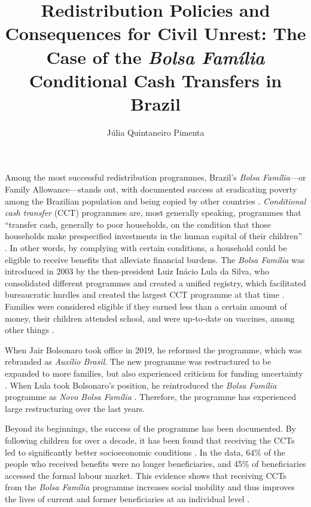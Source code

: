 \documentclass[stu,12pt]{apa7}
\title{Redistribution Policies and Consequences for Civil Unrest: The Case of the \textit{Bolsa Família} Conditional Cash Transfers in Brazil}
\author{Júlia Quintaneiro Pimenta}
\affiliation{\mbox{Master in the Social Sciences, Universidad Carlos III de Madrid}}
\begin{document}
\maketitle

Among the most successful redistribution programmes, Brazil’s \textit{Bolsa Família}—or Family Allowance—stands out, with documented success at eradicating poverty among the Brazilian population and being copied by other countries \parencite{franConditionalCashTransfers}. \textit{Conditional cash transfer} (CCT) programmes are, most generally speaking, programmes that “transfer cash, generally to poor households, on the condition that those households make prespecified investments in the human capital of their children” \parencite[1]{franConditionalCashTransfers}. In other words, by complying with certain conditions, a household could be eligible to receive benefits that alleviate financial burdens. The \textit{Bolsa Família} was introduced in 2003 by the then-president Luiz Inácio Lula da Silva, who consolidated different programmes and created a unified registry, which facilitated bureaucratic hurdles and created the largest CCT programme at that time \parencite{PDFNutsBolts}. Families were considered eligible if they earned less than a certain amount of money, their children attended school, and were up-to-date on vaccines, among other things \parencite{PDFNutsBolts}.

When Jair Bolsonaro took office in 2019, he reformed the programme, which was rebranded as \textit{Auxílio Brasil}. The new programme was restructured to be expanded to more families, but also experienced criticism for funding uncertainty \parencite{figueiredoProgramaAuxilioBrasil2022}. When Lula took Bolsonaro’s position, he reintroduced the \textit{Bolsa Família} programme as \textit{Novo Bolsa Família} \parencite{valeEfeitoAumentoNo2025a}. Therefore, the programme has experienced large restructuring over the last years.

Beyond its beginnings, the success of the programme has been documented. By following children for over a decade, it has been found that receiving the CCTs led to significantly better socioeconomic conditions \parencite{fassarellaSocialMobilityCCT2024}. In the data, 64\% of the people who received benefits were no longer beneficiaries, and 45\% of beneficiaries accessed the formal labour market. This evidence shows that receiving CCTs from the \textit{Bolsa Família} programme increases social mobility and thus improves the lives of current and former beneficiaries at an individual level \parencite{fassarellaSocialMobilityCCT2024}.
\end{document}
